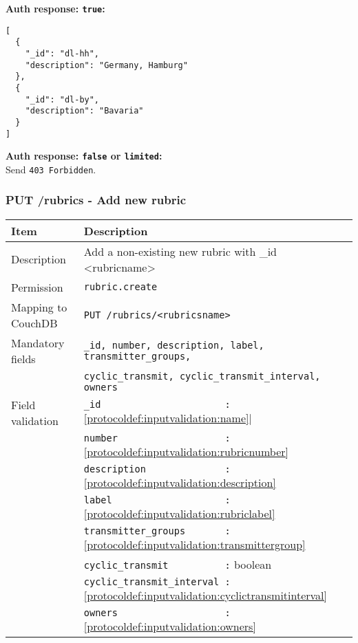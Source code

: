 \textbf{Auth response: \texttt{true}:}
\begin{lstlisting}
[
  {
    "_id": "dl-hh",
    "description": "Germany, Hamburg"
  },
  {
    "_id": "dl-by",
    "description": "Bavaria"
  }
]  
\end{lstlisting}

\textbf{Auth response: \texttt{false} or \texttt{limited}:}\\
Send \verb|403 Forbidden|.


\subsubsection{PUT /rubrics - Add new rubric}
\label{protocoldef:microservicesapi:database:putrubrics/rubrics_create}
\begin{table}[htbp]
  \begin{tabular}{|l|p{12cm}|} \hline
    Item               & Description  \\ \hline \hline
    Description        & Add a non-existing new rubric with \_id <rubricname>\\ \hline
    Permission         & \verb|rubric.create| \\ \hline
    Mapping to CouchDB & \verb|PUT /rubrics/<rubricsname>|\\ \hline
    Mandatory fields   & \verb|_id, number, description, label, transmitter_groups,| \\
                       & \verb|cyclic_transmit, cyclic_transmit_interval, owners| \\ \hline
    Field validation   & \verb|_id                      :| \ref{protocoldef:inputvalidation:name}| \\
                       & \verb|number                   :| \ref{protocoldef:inputvalidation:rubricnumber} \\
                       & \verb|description              :| \ref{protocoldef:inputvalidation:description} \\
                       & \verb|label                    :| \ref{protocoldef:inputvalidation:rubriclabel} \\
                       & \verb|transmitter_groups       :| \ref{protocoldef:inputvalidation:transmittergroup} \\
                       & \verb|cyclic_transmit          :| boolean \\
                       & \verb|cyclic_transmit_interval :| \ref{protocoldef:inputvalidation:cyclictransmitinterval} \\
                       & \verb|owners                   :| \ref{protocoldef:inputvalidation:owners} \\ \hline
  \end{tabular}
\end{table}

